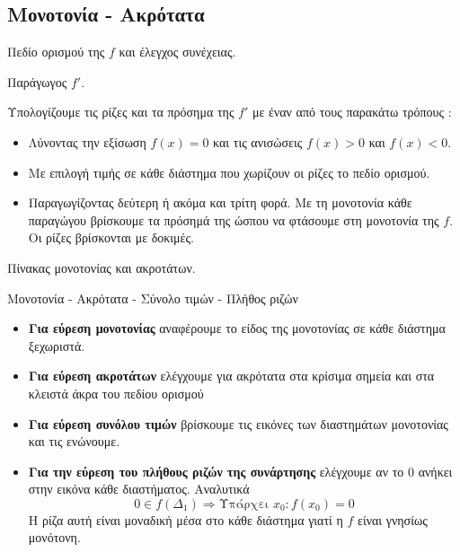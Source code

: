 \documentclass[a4paper,11pt,twoside]{article}
\def\xrwma{red!80!black}
\newcommand{\kerkissans}[1]{{\fontfamily{maksf}\selectfont {#1}}}
\newcounter{askhsh}[section]
\renewcommand{\theaskhsh}{\thesection.\arabic{askhsh}}
\newcommand{\Askhsh}{\refstepcounter{askhsh}{\textbf{\textcolor{\xrwma}{\faPenSquare\ \  \large \kerkissans{\textbf{Άσκηση\hspace{2mm}\theaskhsh}}}}}\hspace{1mm}}{}
\newenvironment{askhsh}[1]
{\begin{tcolorbox}[title=\Askhsh\ \ :\ \  {\textcolor{black}{\kerkissans{\bmath{#1}}}},breakable,
enhanced standard,titlerule=-.2pt,toprule=0pt, rightrule=0pt, bottomrule=0pt,
colback=white,left=2mm,top=1mm,bottom=0mm,
boxrule=0pt,
colframe=white,borderline west={1.5mm}{0pt}{\xrwma},leftrule=2mm,sharp corners,coltitle=\xrwma]}
{\end{tcolorbox}}
\newcommand{\bhmata}{\textcolor{red!80!black}{\kerkissans{{\large \textbf{Βήματα}\\\vspace{-7mm}}}}}
\begin{document}
\subsection{Μονοτονία - Ακρότατα}
\begin{askhsh}{Μονοτονία - Ακρότατα - Σύνολο τιμών - Πλήθος ριζών}
\bhmata\begin{bhma}
\item Πεδίο ορισμού της $ f $ και έλεγχος συνέχειας.
\item Παράγωγος $ f' $.
\item Υπολογίζουμε τις ρίζες και τα πρόσημα της $ f' $ με έναν από τους παρακάτω τρόπους :
\begin{itemize}[leftmargin=5mm]
\item Λύνοντας την εξίσωση $ f(x)=0 $  και τις ανισώσεις $ f(x)>0 $ και $ f(x)<0 $.
\item Με επιλογή τιμής σε κάθε διάστημα που χωρίζουν οι ρίζες το πεδίο ορισμού.
\item Παραγωγίζοντας δεύτερη ή ακόμα και τρίτη φορά. Με τη μονοτονία κάθε παραγώγου βρίσκουμε τα πρόσημά της ώσπου να φτάσουμε στη μονοτονία της $ f $. Οι ρίζες βρίσκονται με δοκιμές.
\end{itemize}
\item Πίνακας μονοτονίας και ακροτάτων.
\item Μονοτονία - Ακρότατα - Σύνολο τιμών - Πλήθος ριζών\\\vspace{-7mm}
\begin{itemize}[leftmargin=5mm]
\item \textbf{Για εύρεση μονοτονίας} αναφέρουμε το είδος της μονοτονίας σε κάθε διάστημα ξεχωριστά. 
\item \textbf{Για εύρεση ακροτάτων} ελέγχουμε για ακρότατα στα κρίσιμα σημεία και στα κλειστά άκρα του πεδίου ορισμού 
\item \textbf{Για εύρεση συνόλου τιμών} βρίσκουμε τις εικόνες των διαστημάτων μονοτονίας και τις ενώνουμε.
\item \textbf{Για την εύρεση του πλήθους ριζών της συνάρτησης} ελέγχουμε αν το $ 0 $ ανήκει στην εικόνα κάθε διαστήματος. Αναλυτικά
\[ 0\in f(\Delta_1)\Rightarrow \textrm{Υπάρχει }x_0 : f(x_0)=0 \]
Η ρίζα αυτή είναι μοναδική μέσα στο κάθε διάστημα γιατί η $ f $ είναι γνησίως μονότονη.
\end{itemize}
\end{bhma}
\end{askhsh}
\end{document}
